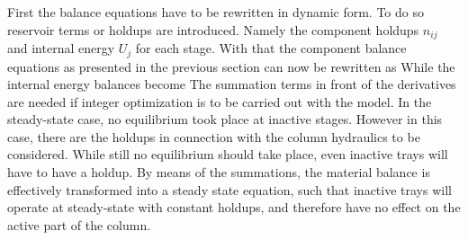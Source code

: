    First the balance equations have to be rewritten in dynamic form. To do so reservoir terms or holdups
    are introduced. Namely the component holdups $n_{ij}$ and internal energy $U_j$ for each stage.
    With that the component balance equations as presented in the previous section can now be rewritten as
    While the internal energy balances become
    The summation terms in front of the derivatives are needed if integer optimization is to be carried out with the model.
    In the steady-state case, no equilibrium took place at inactive stages. However in this case, there are the holdups
    in connection with the column hydraulics to be considered. While still no equilibrium should take place,
    even inactive trays will have to have a holdup. By means of the summations, the material balance is
    effectively transformed into a steady state equation, such that inactive trays will operate at steady-state
    with constant holdups, and therefore have no effect on the active part of the column.

